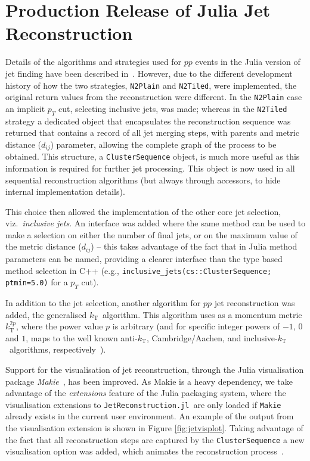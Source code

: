 \documentclass{webofc}
\newcommand{\kt}{${k}_\text{T}$}
\newcommand{\akt}{anti-${k}_\text{T}$}
\newcommand{\JR}{\texttt{JetReconstruction.jl}}
\begin{document}
\section{Production Release of Julia Jet Reconstruction}
\label{sec:prodrel}

Details of the algorithms and strategies used for $pp$ events in the Julia
version of jet finding have been described in~\cite{polyglot-jets-chep23}.
However, due to the different development history of how the two strategies,
\texttt{N2Plain} and \texttt{N2Tiled}, were implemented, the original return
values from the reconstruction were different. In the \texttt{N2Plain} case an
implicit $p_T$ cut, selecting inclusive jets, was made; whereas in the
\texttt{N2Tiled} strategy a dedicated  object that encapsulates the
reconstruction sequence was returned that contains a record of all jet merging
steps, with parents and metric distance ($d_{ij}$) parameter, allowing the
complete graph of the process to be obtained. This structure, a
\texttt{ClusterSequence} object, is much more useful as this information is
required for further jet processing. This object is now used in all sequential
reconstruction algorithms (but always through accessors, to hide internal
implementation details).

This choice then allowed the implementation of the other core jet selection,
viz.\ \emph{inclusive jets}. An interface was added where the same method can be
used to make a selection on either the number of final jets, or on the maximum
value of the metric distance ($d_{ij}$) -- this takes advantage of the fact that
in Julia method parameters can be named, providing a clearer interface than the
type based method selection in C++ (e.g.,
\texttt{inclusive\_jets(cs::ClusterSequence; ptmin=5.0)} for a $p_T$ cut).

In addition to the jet selection, another algorithm for $pp$ jet reconstruction
was added, the generalised \kt\ algorithm. This algorithm uses as a momentum
metric $k^{2p}_\text{T}$, where the power value $p$ is arbitrary (and for
specific integer powers of $-1$, $0$ and $1$, maps to the well known \akt,
Cambridge/Aachen, and inclusive-\kt\ algorithms,
respectively~\cite{Cacciari:2005hq,Matteo_Cacciari_2008,fastjetmanual}).

Support for the visualisation of jet reconstruction, through the Julia
visualisation package \emph{Makie}~\cite{Danisch2021}, has been improved. As
Makie is a heavy dependency, we take advantage of the \emph{extensions} feature
of the Julia packaging system, where the visualisation extensions to \JR\ are
only loaded if \texttt{Makie} already exists in the current user environment. An
example of the output from the visualisation extension is shown in Figure
\ref{fig:jetvisplot}. Taking advantage of the fact that all reconstruction steps
are captured by the \texttt{ClusterSequence} a new visualisation option was
added, which animates the reconstruction
process~\cite{jetrecoAnimationCHEP2024}.
\end{document}
